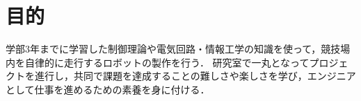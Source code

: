 \documentclass[11pt,a4j]{jarticle}
\begin{document}


\newpage
	\tableofcontents

\newpage
\section{目的}
	学部3年までに学習した制御理論や電気回路・情報工学の知識を使って，競技場内を自律的に走行するロボットの製作を行う．
	研究室で一丸となってプロジェクトを進行し，共同で課題を達成することの難しさや楽しさを学び，エンジニアとして仕事を進めるための素養を身に付ける．


\end{document}
